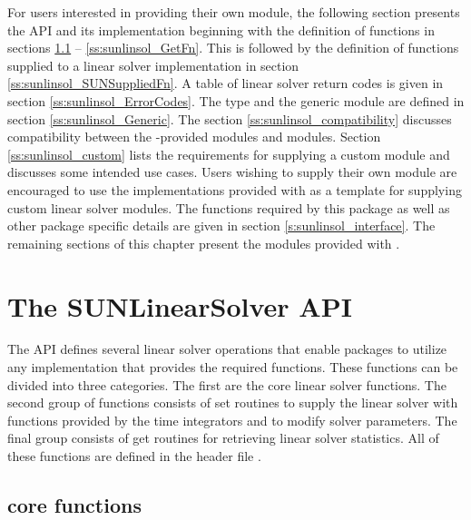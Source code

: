 For users interested in providing their own {\sunlinsol} module, the
following section presents the {\sunlinsol} API and its implementation
beginning with the definition of {\sunlinsol} functions in sections
\ref{ss:sunlinsol_CoreFn} -- \ref{ss:sunlinsol_GetFn}. This is followed by
the definition of functions supplied to a linear solver implementation in
section \ref{ss:sunlinsol_SUNSuppliedFn}. A table of linear solver return
codes is given in section \ref{ss:sunlinsol_ErrorCodes}. The
 type and the generic {\sunlinsol} module are defined
in section \ref{ss:sunlinsol_Generic}.  The section
\ref{ss:sunlinsol_compatibility} discusses compatibility between the
{\sundials}-provided {\sunlinsol} modules and {\sunmatrix} modules.
Section \ref{ss:sunlinsol_custom} lists the requirements for supplying a custom
{\sunlinsol} module and discusses some intended use cases. Users wishing to
supply their own {\sunlinsol} module are encouraged to use the {\sunlinsol}
implementations provided with {\sundials} as a template for supplying custom
linear solver modules. The {\sunlinsol} functions required by this {\sundials}
package as well as other package specific details are given in
section \ref{s:sunlinsol_interface}. The remaining sections of this chapter
present the {\sunlinsol} modules provided with {\sundials}.

\section{The SUNLinearSolver API}
\label{s:sunlinsol_api}

The {\sunlinsol} API defines several linear solver operations that enable
{\sundials} packages to utilize any {\sunlinsol} implementation that
provides the required functions. These functions can be divided into three
categories. The first are the core linear solver functions. The second group
of functions consists of set routines to supply the linear solver with
functions provided by the {\sundials} time integrators and to modify solver
parameters. The final group consists of get routines for retrieving linear
solver statistics. All of these functions are defined in the header file
.



\subsection{ core functions}\label{ss:sunlinsol_CoreFn}

